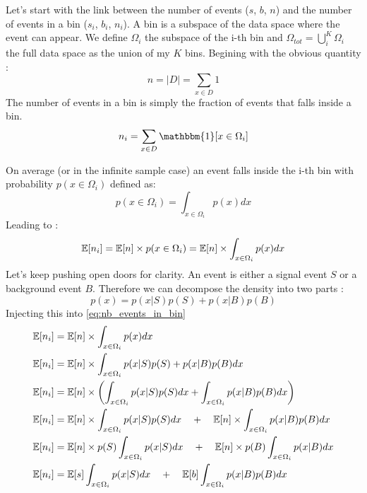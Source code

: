 Let's start with the link between the number of events ($s$, $b$, $n$) and the number of events in a bin ($s_i$, $b_i$, $n_i$).
A bin is a subspace of the data space where the event can appear.
We define $\Omega_i$ the subspace of the i-th bin and $\Omega_{tot} = \bigcup_i^K \Omega_i $ the full data space as the union of my $K$ bins.
Begining with the obvious quantity :
\begin{equation}
	n = |D| = \sum_{x\in D} 1
\end{equation}
The number of events in a bin is simply the fraction of events that falls inside a bin.
\begin{equation}
	n_i = \sum_{x\in D} \mathbbm{1} [x\in \Omega_i]
\end{equation}



On average (or in the infinite sample case) an event falls inside the i-th bin with probability $p(x \in \Omega_i)$ defined as:
\begin{equation}
	p(x \in \Omega_i) = \int_{x \in \Omega_i} p(x) dx
\end{equation}
Leading to :
\begin{equation}
	\label{eq:nb_events_in_bin}
	\mathbb{E} [n_i] = \mathbb{E} [n] \times p(x \in \Omega_i)  = \mathbb{E}[n] \times \int_{x \in \Omega_i} p(x) dx
\end{equation}
Let's keep pushing open doors for clarity.
An event is either a signal event $S$ or a background event $B$.
Therefore we can decompose the density into two parts :
\begin{equation}
	p(x) = p(x|S) p(S) + p(x|B) p(B)
\end{equation}
Injecting this into \autoref{eq:nb_events_in_bin}
\begin{align}
	\mathbb{E} [n_i] &= \mathbb{E}[n] \times \int_{x \in \Omega_i} p(x) dx \\
	\mathbb{E} [n_i] &= \mathbb{E}[n] \times \int_{x \in \Omega_i} p(x|S) p(S) + p(x|B) p(B) dx \\
	\mathbb{E} [n_i] &= \mathbb{E}[n] \times \left ( \int_{x \in \Omega_i} p(x|S) p(S) dx + \int_{x \in \Omega_i}  p(x|B) p(B) dx \right )\\
	\mathbb{E} [n_i] &= \mathbb{E}[n] \times \int_{x \in \Omega_i} p(x|S) p(S) dx \quad+\quad \mathbb{E}[n] \times \int_{x \in \Omega_i}  p(x|B) p(B) dx \\
	\mathbb{E} [n_i] &= \mathbb{E}[n] \times p(S) \int_{x \in \Omega_i} p(x|S) dx \quad+\quad \mathbb{E}[n] \times p(B) \int_{x \in \Omega_i}  p(x|B) dx \\
	\mathbb{E} [n_i] &= \mathbb{E}[s] \int_{x \in \Omega_i} p(x|S) dx \quad+\quad \mathbb{E}[b] \int_{x \in \Omega_i}  p(x|B) p(B) dx \\
\end{align}
